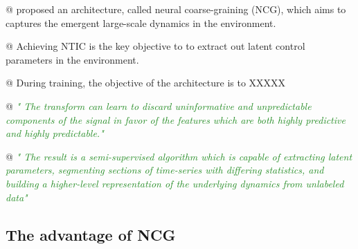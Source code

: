 \documentclass[utf8]{article}
\makeatletter
\newenvironment{ants}
			{
			 \begin{easylist}[itemize]		
		 	}
			{
			\end{easylist}
			}
\newcommand{\rewrite}[1]{\textcolor{ForestGreen}{\textit{"#1"}}\newline}
\newcommand{\martin}[1]{\todo[color=SpringGreen]{@Martin:\\#1}}
\makeatother
\begin{document}
		
		
			\begin{ants}
				@ \citep{guttenberg2016neural} proposed an architecture, called neural coarse-graining (NCG), which aims to captures the emergent large-scale dynamics in the environment. 
				
				@ Achieving NTIC is the key objective to to extract out latent control parameters in the environment.
				
				@ During training, the objective of the architecture is to XXXXX\martin{todo}
				
				 
				@ \rewrite{
					The transform can learn to discard uninformative and unpredictable components of the signal in favor of the features which are both highly predictive and highly predictable.}\citep{guttenberg2016neural}
							
				
				
				@ \rewrite{
					The result is a semi-supervised algorithm which is capable of extracting latent parameters, segmenting sections of time-series with diﬀering statistics, and building a higher-level representation of the underlying dynamics from unlabeled data}\citep{guttenberg2016neural}
				
			\end{ants}
		
		
		
			
		\subsection{The advantage of NCG}

			
			
\end{document}

